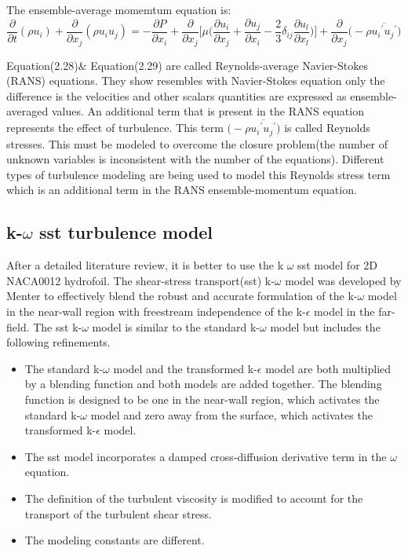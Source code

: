The ensemble-average momemtum equation is:
\begin{equation}
{{{\frac{\partial}{\partial t}}(\rho u_i)}+{{\frac{\partial}{\partial
        x_j}}(\rho{u_i}{u_j})}}={-{\frac{\partial P}{\partial
      x_i}}+{\frac{\partial}{\partial
      x_j}}{\Bigg[{\mu}\Bigg({{{\frac{\partial u_i} {\partial
              x_j}}+{\frac{\partial u_j}{\partial
              x_i}}-{\frac{2}{3}}{{\delta}_{ij}}{\frac{\partial
              u_l}{\partial
              x_l}}}}\Bigg)\Bigg]+{\frac{\partial}{\partial
        x_j}}\bigg({-}{\rho}{\overline{{{u_i}^\prime}{{u_j}^\prime}}}\bigg)}}
\end{equation}

Equation(2.28)$\&$ Equation(2.29) are called Reynolds-average
Navier-Stokes (RANS) equations. They show resembles with Navier-Stokes
equation only the difference is the velocities and other scalars
quantities are expressed as ensemble-averaged values. An additional
term that is present in the RANS equation represents the effect of
turbulence. This term
$\bigg({-}{\rho}{\overline{{{u_i}^\prime}{{u_j}^\prime}}}\bigg)$ is
called Reynolds stresses. This must be modeled to overcome the closure
problem(the number of unknown variables is inconsistent with the
number of the equations). Different types of turbulence modeling are
being used to model this Reynolds stress term which is an additional
term in the RANS ensemble-momentum equation.

\subsection{k-$\omega$ sst turbulence model}
After a detailed literature review, it is better to use the k $\omega$
sst model for 2D NACA0012 hydrofoil\cite{Zhao2021,ANSYS}. The
shear-stress transport(sst) k-$\omega$ model was developed by Menter
to effectively blend the robust and accurate formulation of the
k-$\omega$ model in the near-wall region with freestream independence
of the k-$\epsilon$ model in the far-field. The sst k-$\omega$ model
is similar to the standard k-$\omega$ model but includes the following
refinements.

\begin{itemize}
\item The standard k-$\omega$ model and the transformed k-$\epsilon$
  model are both multiplied by a blending function and both models are
  added together. The blending function is designed to be one in the
  near-wall region, which activates the standard k-$\omega$ model and
  zero away from the surface, which activates the transformed
  k-$\epsilon$ model.
\item The sst model incorporates a damped cross-diffusion derivative
  term in the $\omega$ equation.
\item The definition of the turbulent viscosity is modified to account
  for the transport of the turbulent shear stress.
\item The modeling constants are different.
\end{itemize}

